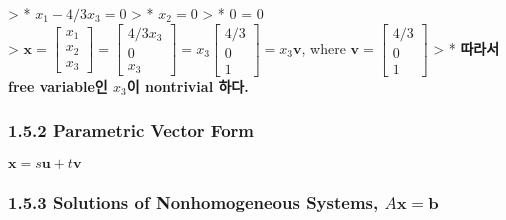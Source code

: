 \documentclass[11pt]{article}
\begin{document}
\begin{itemize}
  \textgreater{} * \(x_{1} - 4/3x_{3} = 0\) \textgreater{} *
  \(x_{2} = 0\) \textgreater{} * 0 = 0\\
  \textgreater{}
  \(\mathbf{x} = \begin{bmatrix} x_{1} \\ x_{2} \\ x_{3} \end{bmatrix} = \begin{bmatrix} 4/3x_{3} \\ 0 \\ x_{3} \end{bmatrix} = x_{3}\begin{bmatrix} 4/3 \\ 0 \\ 1 \end{bmatrix} = x_{3}\mathbf{v}\),
  where \(\mathbf{v}=\begin{bmatrix} 4/3 \\ 0 \\ 1 \end{bmatrix}\)
  \textgreater{} * \textbf{따라서 free variable인 \(x_{3}\)이 nontrivial
  하다.}
\end{itemize}

\hypertarget{parametric-vector-form}{%
\subsubsection{1.5.2 Parametric Vector
Form}\label{parametric-vector-form}}

\(\mathbf{x} = s\mathbf{u} + t\mathbf{v}\)

\hypertarget{solutions-of-nonhomogeneous-systems-amathbfx-mathbfb}{%
\subsubsection{\texorpdfstring{1.5.3 Solutions of Nonhomogeneous
Systems,
\(A\mathbf{x} = \mathbf{b}\)}{1.5.3 Solutions of Nonhomogeneous Systems, A\textbackslash{}mathbf\{x\} = \textbackslash{}mathbf\{b\}}}\label{solutions-of-nonhomogeneous-systems-amathbfx-mathbfb}}
\end{document}
